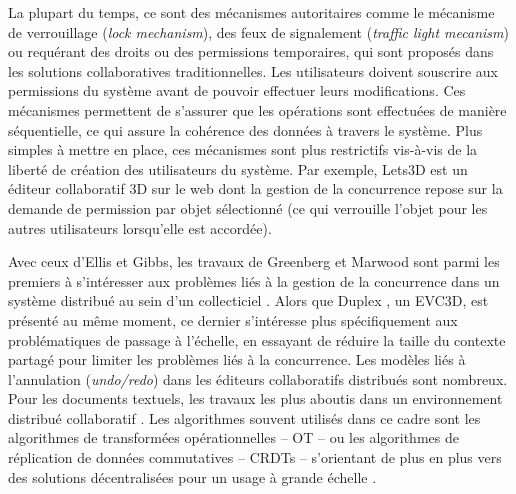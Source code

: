 La plupart du temps, ce sont des mécanismes autoritaires comme le mécanisme 
de verrouillage (\textit{lock mechanism}), des feux de signalement (\textit{traffic 
light mecanism}) ou requérant des droits ou des permissions temporaires, qui sont 
proposés dans les solutions collaboratives traditionnelles. Les utilisateurs doivent 
souscrire aux permissions du système avant de pouvoir effectuer leurs 
modifications. Ces mécanismes permettent de s'assurer que les opérations sont 
effectuées de manière séquentielle, ce qui assure la cohérence des données à 
travers le système. Plus simples à mettre en place, ces mécanismes sont plus 
restrictifs vis-à-vis de la liberté de création des utilisateurs du système. Par 
exemple, Lets3D \cite{Ha2015} est un éditeur collaboratif 3D sur le web dont la 
gestion de la concurrence repose sur la demande de permission par objet 
sélectionné (ce qui verrouille l'objet pour les autres utilisateurs lorsqu'elle est 
accordée).

 Avec ceux d'Ellis et Gibbs, les travaux de Greenberg et Marwood sont parmi les 
premiers à s'intéresser aux problèmes liés à la gestion de la concurrence dans 
un système distribué au sein d'un collecticiel \cite{Ellis1989,Greenberg1994}. 
Alors que Duplex \cite{Pacull1994}, un \gls{EVC3D}, est présenté au même 
moment, ce dernier s'intéresse plus spécifiquement aux problématiques de 
passage à l'échelle, en essayant de réduire la taille du contexte partagé pour 
limiter les problèmes liés à la concurrence. 
Les modèles liés à l'annulation (\textit{undo/redo}) dans les éditeurs collaboratifs 
distribués sont nombreux. Pour les documents textuels, les travaux les plus 
aboutis dans un environnement distribué collaboratif 
\cite{Prakash1994,Sun2002,Ressel}. Les 
algorithmes souvent utilisés dans ce cadre sont les algorithmes 
de  transformées opérationnelles -- \gls{OT} -- \cite{Ellis1989} ou les algorithmes 
de réplication de  données commutatives -- \glspl{CRDT} -- \cite{Shapiro2007} 
s'orientant de plus en plus vers des solutions décentralisées pour un usage à 
grande échelle \cite{Weiss2009a}. 

